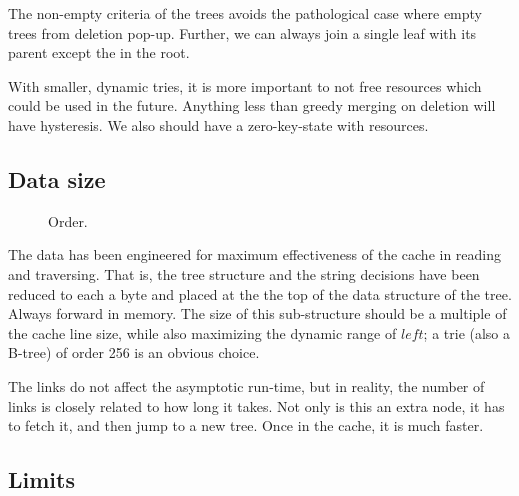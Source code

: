 \documentclass[12pt]{article}
\begin{document}
The non-empty criteria of the trees avoids the pathological case where empty trees from deletion pop-up. Further, we can always join a single leaf with its parent except the in the root.

With smaller, dynamic tries, it is more important to not free resources which could be used in the future. Anything less than greedy merging on deletion will have hysteresis. We also should have a zero-key-state with resources.


\subsection{Data size}

\begin{figure}%
\centering%
\caption{Order.}%
\label{timing}%
\end{figure}%

The data has been engineered for maximum effectiveness of the cache in reading and traversing. That is, the tree structure and the string decisions have been reduced to each a byte and placed at the the top of the data structure of the tree. Always forward in memory. The size of this sub-structure should be a multiple of the cache line size, while also maximizing the dynamic range of $$; a trie (also a B-tree) of order 256 is an obvious choice.\cite{sinha2004cache}

The links do not affect the asymptotic run-time, but in reality, the number of links is closely related to how long it takes. Not only is this an extra node, it has to fetch it, and then jump to a new tree. Once in the cache, it is much faster.

\subsection{Limits}


\end{document}
